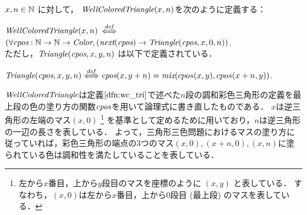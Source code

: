 \begin{dfn}[$\WCT$]\rm
  $x, n \in \mathbb{N}$ に対して，
  $\textit{WellColoredTriangle}(x, n)$を次のように定義する：
  
  $\textit{WellColoredTriangle}(x, n)$ $\overset{{\it def}}{\Longleftrightarrow}$ $(\forall \textit{cpos}: \mathbb{N} \to \mathbb{N} \to \textit{Color}, (\textit{next}(\textit{cpos}) \to \textit{Triangle}(\textit{cpos},x,0,n))$. \\
  ただし，$\textit{Triangle}(\textit{cpos},x,y,n)$ は以下で定義されている．

  $\textit{Triangle}(\textit{cpos},x,y,n) \overset{{\it def}}{\Longleftrightarrow}
  \textit{cpos}(x,y+n) = \textit{mix}(cpos(x,y),cpos(x+n,y))$.
\end{dfn}
$\WCT$は定義$\ref{dfn:wc_tri}$で述べた$n$段の調和彩色三角形の定義を最上段の色の塗り方の関数$\textit{cpos}$を用いて論理式に書き直したものである．
$x$は逆三角形の左端のマス$(x,0)$
\footnote
    {
      左から$x$番目，上から$y$段目のマスを座標のように $(x,y)$ と表している．
      すなわち，$(x,0)$は左から$x$番目，上から$0$段目 (最上段) のマスを表している．
    }
    を基準として定めるために用いており，$n$は逆三角形の一辺の長さを表している．
    よって，三角形三色問題におけるマスの塗り方に従っていれば，彩色三角形の端点の$3$つのマス$(x,0), (x+n,0), (x,n)$に塗られている色は調和性を満たしていることを表している．


